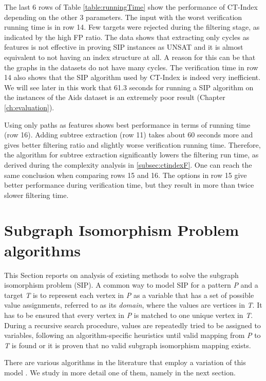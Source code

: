 \documentclass{l4proj}
\begin{document}
The last 6 rows of Table \ref{table:runningTime} show the performance of CT-Index depending on the other 3 parameters. The input with the worst verification running time is in row 14. Few targets were rejected during the filtering stage, as indicated by the high FP ratio. The data shows that extracting only cycles as features is not effective in proving SIP instances as UNSAT and it is almost equivalent to not having an index structure at all. A reason for this can be that the graphs in the datasets do not have many cycles. The verification time in row 14 also shows that the SIP algorithm used by CT-Index is indeed very inefficient. We will see later in this work that 61.3 seconds for running a SIP algorithm on the instances of the Aids dataset is an extremely poor result (Chapter \ref{ch:evaluation}).

Using only paths as features shows best performance in terms of running time (row 16). Adding subtree extraction (row 11) takes about 60 seconds more and gives better filtering ratio and slightly worse verification running time. Therefore, the algorithm for subtree extraction significantly lowers the filtering run time, as derived during the complexity analysis in \ref{subsec:ctindexF}. One can reach the same conclusion when comparing rows 15 and 16. The options in row 15 give better performance during verification time, but they result in more than twice slower filtering time.


\section{Subgraph Isomorphism Problem algorithms}
This Section reports on analysis of existing methods to solve the subgraph isomorphism problem (SIP). A common way to model SIP for a pattern \emph{P} and a target \emph{T} is to represent each vertex in \emph{P} as a variable that has a set of possible value assignments, referred to as its \emph{domain}, where the values are vertices in \emph{T}. It has to be ensured that every vertex in \emph{P} is matched to one unique vertex in \emph{T}. During a recursive search procedure, values are repeatedly tried to be assigned to variables, following an algorithm-specific heuristics until valid mapping from \emph{P} to \emph{T} is found or it is proven that no valid subgraph isomorphism mapping exists.
 
There are various algorithms in the literature that employ a variation of this model \cite{Solnon:2010, Ullmann:1976, Regin:1995, Larrosa:2002, Solnon:2010a, CP2015}. We study in more detail one of them, namely \cite{CP2015} in the next section.
\end{document}
